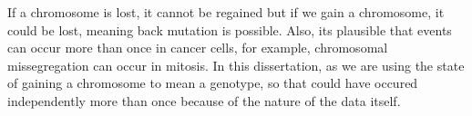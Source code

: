 If a chromosome is lost, it cannot be regained but if we gain a chromosome, it could be lost, meaning back mutation is possible. Also, its plausible that events can occur more than once in cancer cells, for example, chromosomal missegregation can occur in mitosis. In this dissertation, as we are using the state of gaining a chromosome to mean a genotype, so that could have occured independently more than once because of the nature of the data itself.

 












